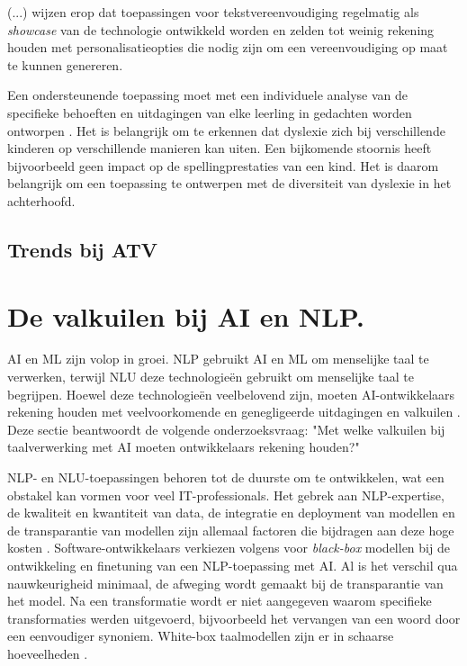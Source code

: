 (...) wijzen erop dat toepassingen voor tekstvereenvoudiging regelmatig als \textit{showcase} van de technologie ontwikkeld worden en zelden tot weinig rekening houden met personalisatieopties die nodig zijn om een vereenvoudiging op maat te kunnen genereren. %

\medspace

Een ondersteunende toepassing moet met een individuele analyse van de specifieke behoeften en uitdagingen van elke leerling in gedachten worden ontworpen \autocite{Gooding2022}. Het is belangrijk om te erkennen dat dyslexie zich bij verschillende kinderen op verschillende manieren kan uiten. Een bijkomende stoornis heeft bijvoorbeeld geen impact op de spellingprestaties van een kind. Het is daarom belangrijk om een toepassing te ontwerpen met de diversiteit van dyslexie in het achterhoofd. 

\subsection{Trends bij ATV}




\section{De valkuilen bij AI en NLP.}
AI en ML zijn volop in groei. NLP gebruikt AI en ML om menselijke taal te verwerken, terwijl NLU deze technologieën gebruikt om menselijke taal te begrijpen. Hoewel deze technologieën veelbelovend zijn, moeten AI-ontwikkelaars rekening houden met veelvoorkomende en genegligeerde uitdagingen en valkuilen \autocite{Sciforce2020, Roldos2020, Khurana2022}. Deze sectie beantwoordt de volgende onderzoeksvraag: "Met welke valkuilen bij taalverwerking met AI moeten ontwikkelaars rekening houden?"

\medspace

NLP- en NLU-toepassingen behoren tot de duurste om te ontwikkelen, wat een obstakel kan vormen voor veel IT-professionals. Het gebrek aan NLP-expertise, de kwaliteit en kwantiteit van data, de integratie en deployment van modellen en de transparantie van modellen zijn allemaal factoren die bijdragen aan deze hoge kosten \autocite{IBM2022}. Software-ontwikkelaars verkiezen volgens  voor \textit{black-box} modellen bij de ontwikkeling en finetuning van een NLP-toepassing met AI. Al is het verschil qua nauwkeurigheid minimaal, de afweging wordt gemaakt bij de transparantie van het model. Na een transformatie wordt er niet aangegeven waarom specifieke transformaties werden uitgevoerd, bijvoorbeeld het vervangen van een woord door een eenvoudiger synoniem. White-box taalmodellen zijn er in schaarse hoeveelheden \autocite{Punardeep2020}.

